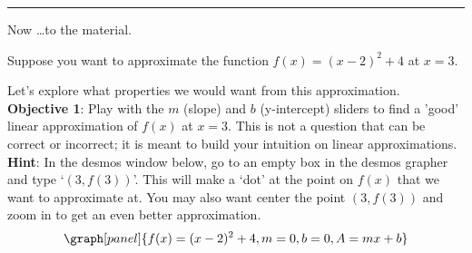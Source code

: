 \documentclass[handout,nooutcomes]{ximera}
\begin{document}
\hrule
\bigskip

Now \dots to the material.\\
\medskip

Suppose you want to approximate the function $f(x) = (x-2)^2  + 4$ at $x=3$.

Let's explore what properties we would want from this approximation.\\


\textbf{Objective 1}: Play with the $m$ (slope) and $b$ (y-intercept) sliders to find
a 'good' linear approximation of $f(x)$ at $x=3$. This is not a question
that can be correct or incorrect; it is meant to build your intuition
on linear approximations.\\

\textbf{Hint}: In the desmos window below, go to an empty box in the 
desmos grapher and type `$(3,f(3))$'. This will make a `dot' at the point
on $f(x)$ that we want to approximate at. You may also want center
the point $(3, f(3))$ and zoom in to get an even better approximation.
\[
\graph[panel]{f(x) = (x-2)^2 + 4, m=0, b=0, A=mx+b}
\]
\end{document}
